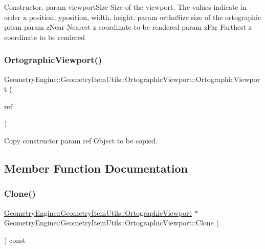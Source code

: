 Constructor. param viewport\+Size Size of the viewport. The values indicate in order x position, yposition, width, height. param ortho\+Size size of the ortographic prism param z\+Near Nearest z coordinate to be rendered param z\+Far Farthest z coordinate to be rendered \mbox{\label{class_geometry_engine_1_1_geometry_item_utils_1_1_ortographic_viewport_a522e8770371fa1f12b0257e48773d201}} 
\subsubsection{\texorpdfstring{OrtographicViewport()}{OrtographicViewport()}\hspace{0.1cm}{\footnotesize\ttfamily [2/2]}}
{\footnotesize\ttfamily Geometry\+Engine\+::\+Geometry\+Item\+Utils\+::\+Ortographic\+Viewport\+::\+Ortographic\+Viewport (\begin{DoxyParamCaption}\item[{const \mbox{\hyperlink{class_geometry_engine_1_1_geometry_item_utils_1_1_ortographic_viewport}{Ortographic\+Viewport}} \&}]{ref }\end{DoxyParamCaption})}

Copy constructor param ref Object to be copied. 

\subsection{Member Function Documentation}
\mbox{\label{class_geometry_engine_1_1_geometry_item_utils_1_1_ortographic_viewport_a7729f7619d67c139f8510c305de1a286}} 
\subsubsection{\texorpdfstring{Clone()}{Clone()}}
{\footnotesize\ttfamily \mbox{\hyperlink{class_geometry_engine_1_1_geometry_item_utils_1_1_ortographic_viewport}{Geometry\+Engine\+::\+Geometry\+Item\+Utils\+::\+Ortographic\+Viewport}} $\ast$ Geometry\+Engine\+::\+Geometry\+Item\+Utils\+::\+Ortographic\+Viewport\+::\+Clone (\begin{DoxyParamCaption}{ }\end{DoxyParamCaption}) const\hspace{0.3cm}{\ttfamily [virtual]}}

